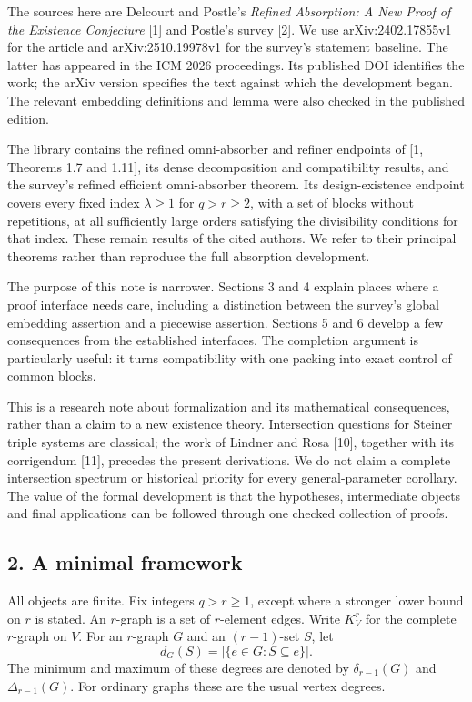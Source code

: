 \documentclass[english,11pt,a4paper]{article}
\begin{document}
The sources here are Delcourt and Postle's \emph{Refined Absorption: A New Proof of the Existence Conjecture} {[}1{]} and Postle's survey {[}2{]}. We use arXiv:2402.17855v1 for the article and arXiv:2510.19978v1 for the survey's statement baseline. The latter has appeared in the ICM 2026 proceedings. Its published DOI identifies the work; the arXiv version specifies the text against which the development began. The relevant embedding definitions and lemma were also checked in the published edition.

The library contains the refined omni-absorber and refiner endpoints of {[}1, Theorems 1.7 and 1.11{]}, its dense decomposition and compatibility results, and the survey's refined efficient omni-absorber theorem. Its design-existence endpoint covers every fixed index \(\lambda\ge1\) for \(q>r\ge2\), with a set of blocks without repetitions, at all sufficiently large orders satisfying the divisibility conditions for that index. These remain results of the cited authors. We refer to their principal theorems rather than reproduce the full absorption development.

The purpose of this note is narrower. Sections 3 and 4 explain places where a proof interface needs care, including a distinction between the survey's global embedding assertion and a piecewise assertion. Sections 5 and 6 develop a few consequences from the established interfaces. The completion argument is particularly useful: it turns compatibility with one packing into exact control of common blocks.

This is a research note about formalization and its mathematical consequences, rather than a claim to a new existence theory. Intersection questions for Steiner triple systems are classical; the work of Lindner and Rosa {[}10{]}, together with its corrigendum {[}11{]}, precedes the present derivations. We do not claim a complete intersection spectrum or historical priority for every general-parameter corollary. The value of the formal development is that the hypotheses, intermediate objects and final applications can be followed through one checked collection of proofs.

\subsection{2. A minimal framework}\label{a-minimal-framework}

All objects are finite. Fix integers \(q>r\ge1\), except where a stronger lower bound on \(r\) is stated. An \(r\)-graph is a set of \(r\)-element edges. Write \(K_V^r\) for the complete \(r\)-graph on \(V\). For an \(r\)-graph \(G\) and an \((r-1)\)-set \(S\), let \[d_G(S)=|\{e\in G:S\subseteq e\}|.\] The minimum and maximum of these degrees are denoted by \(\delta_{r-1}(G)\) and \(\Delta_{r-1}(G)\). For ordinary graphs these are the usual vertex degrees.
\end{document}
